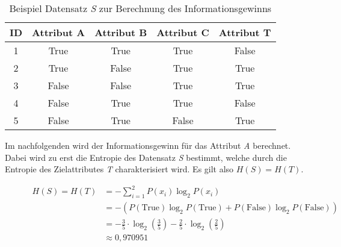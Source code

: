 \begin{center}
    \begin{table}[H]
        \centering
        \begin{tabularx}{0.8\linewidth}{ccccc}
            \toprule
            \textbf{ID} & \textbf{Attribut A} & \textbf{Attribut B} & \textbf{Attribut C} & \textbf{Attribut T}\\
            \toprule

            1 & True    & True  & True  & False \\
            2 & True    & False & True  & True \\
            3 & False   & False & True  & True \\
            4 & False   & True  & True  & False \\
            5 & False   & True  & False & True \\

            \bottomrule
        \end{tabularx}
        \caption{Beispiel Datensatz \textit{S} zur Berechnung des Informationsgewinns \autocite{Informat29:online}}
        \label{table:gain}
    \end{table}
\end{center}

Im nachfolgenden wird der Informationsgewinn für das Attribut \textit{A} berechnet. Dabei wird zu erst die Entropie des Datensatz \textit{S} bestimmt, welche durch die Entropie des Zielattributes \textit{T} charakterisiert wird. Es gilt also $H(S) = H(T)$.

\begin{figure}[htbp]
    \centering
    \begin{align*}
        H(S) = H(T) &= - \sum\limits_{i=1}^{2} P(x_{i}) \log_{2} P(x_{i}) \\
                    &= - ( P(\text{True}) \log_{2} P(\text{True}) + P(\text{False}) \log_{2} P(\text{False}) ) \\
                    &= - \frac{3}{5} \cdot \log_{2} \left(\frac{3}{5}\right) - \frac{2}{5} \cdot \log_{2} \left(\frac{2}{5}\right)\\
                    &\approx 0,970951
    \end{align*}
\end{figure}

